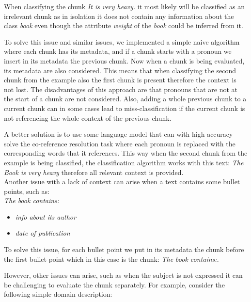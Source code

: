 \noindent{}When classifying the chunk \textit{It is very heavy.} it most likely will be classified as an irrelevant chunk as in isolation it does not contain any information about the class \textit{book} even though the attribute \textit{weight} of the \textit{book} could be inferred from it.

To solve this issue and similar issues, we implemented a simple naive algorithm where each chunk has its metadata, and if a chunk starts with a pronoun we insert in its metadata the previous chunk. Now when a chunk is being evaluated, its metadata are also considered. This means that when classifying the second chunk from the example also the first chunk is present therefore the context is not lost. The disadvantages of this approach are that pronouns that are not at the start of a chunk are not considered. Also, adding a whole previous chunk to a current chunk can in some cases lead to miss-classification if the current chunk is not referencing the whole context of the previous chunk.

A better solution is to use some language model that can with high accuracy solve the co-reference resolution task where each pronoun is replaced with the corresponding words that it references. This way when the second chunk from the example is being classified, the classification algorithm works with this text: \textit{The Book is very heavy} therefore all relevant context is provided. \\

Another issue with a lack of context can arise when a text contains some bullet points, such as: \\

\noindent{}\textit{The book contains:}
\begin{itemize}
\item \textit{info about its author}
\item \textit{date of publication} \\
\end{itemize}

\noindent{}To solve this issue, for each bullet point we put in its metadata the chunk before the first bullet point which in this case is the chunk: \textit{The book contains:}.

However, other issues can arise, such as when the subject is not expressed it can be challenging to evaluate the chunk separately. For example, consider the following simple domain description: \\

